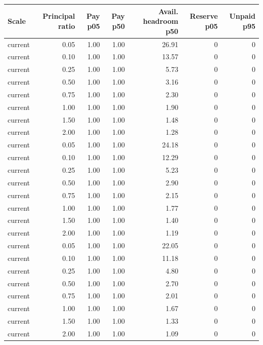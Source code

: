\begingroup
\small
\setlength{\tabcolsep}{3pt}
\begin{tabular}{lrrrrrr}
\toprule
Scale & Principal ratio & Pay p05 & Pay p50 & Avail. headroom p50 & Reserve p05 & Unpaid p95 \\
\midrule
current & 0.05 & 1.00 & 1.00 & 26.91 & 0 & 0 \\
current & 0.10 & 1.00 & 1.00 & 13.57 & 0 & 0 \\
current & 0.25 & 1.00 & 1.00 & 5.73 & 0 & 0 \\
current & 0.50 & 1.00 & 1.00 & 3.16 & 0 & 0 \\
current & 0.75 & 1.00 & 1.00 & 2.30 & 0 & 0 \\
current & 1.00 & 1.00 & 1.00 & 1.90 & 0 & 0 \\
current & 1.50 & 1.00 & 1.00 & 1.48 & 0 & 0 \\
current & 2.00 & 1.00 & 1.00 & 1.28 & 0 & 0 \\
current & 0.05 & 1.00 & 1.00 & 24.18 & 0 & 0 \\
current & 0.10 & 1.00 & 1.00 & 12.29 & 0 & 0 \\
current & 0.25 & 1.00 & 1.00 & 5.23 & 0 & 0 \\
current & 0.50 & 1.00 & 1.00 & 2.90 & 0 & 0 \\
current & 0.75 & 1.00 & 1.00 & 2.15 & 0 & 0 \\
current & 1.00 & 1.00 & 1.00 & 1.77 & 0 & 0 \\
current & 1.50 & 1.00 & 1.00 & 1.40 & 0 & 0 \\
current & 2.00 & 1.00 & 1.00 & 1.19 & 0 & 0 \\
current & 0.05 & 1.00 & 1.00 & 22.05 & 0 & 0 \\
current & 0.10 & 1.00 & 1.00 & 11.18 & 0 & 0 \\
current & 0.25 & 1.00 & 1.00 & 4.80 & 0 & 0 \\
current & 0.50 & 1.00 & 1.00 & 2.70 & 0 & 0 \\
current & 0.75 & 1.00 & 1.00 & 2.01 & 0 & 0 \\
current & 1.00 & 1.00 & 1.00 & 1.67 & 0 & 0 \\
current & 1.50 & 1.00 & 1.00 & 1.33 & 0 & 0 \\
current & 2.00 & 1.00 & 1.00 & 1.09 & 0 & 0 \\
\bottomrule
\end{tabular}
\endgroup
